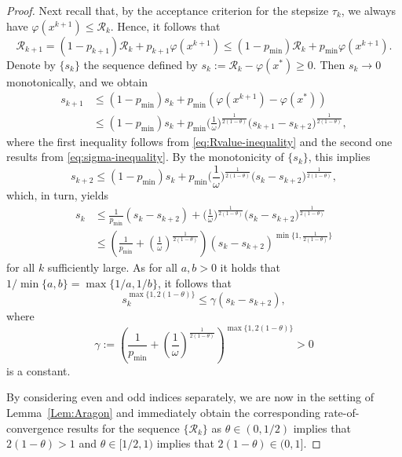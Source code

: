 \documentclass[10pt,a4paper]{amsart}
\newcommand{\Rvalue}{\mathcal{R}}
\newcommand{\pmin}{p_{\min}}
\newcommand{\tauk}{\tau_k}
\newcommand{\xkp}{x^{k+1}}
\begin{document}
\begin{proof}
Next recall that, by the acceptance criterion for the stepsize
$ \tauk $, we always have $ \varphi(\xkp) \leq \Rvalue_k $.
Hence, it follows that
\begin{equation}\label{eq:Rvalue-inequality}
	\Rvalue_{k+1} = (1-p_{k+1}) \Rvalue_k + p_{k+1} \varphi(\xkp) \leq (1-\pmin) \Rvalue_k + \pmin \varphi(\xkp).
\end{equation}
Denote by $\{s_k\}$ the sequence defined by $s_k := \Rvalue_k - \varphi(x^*)
\geq 0 $. Then $ s_k \to 0 $ monotonically, and we obtain
\begin{align*}
	s_{k+1} &\leq (1-\pmin) s_k + \pmin(\varphi(\xkp) - \varphi(x^*))\\
			&\leq (1-\pmin)s_k + \pmin \Big(\frac{1}{\omega}\Big)^{\frac{1}{2(1-\theta)}} \big( s_{k+1} - s_{k+2} \big)^{\frac{1}{2(1-\theta)}} ,
\end{align*}
where the first inequality follows from \eqref{eq:Rvalue-inequality}
and the second one results from \eqref{eq:sigma-inequality}.
	By the monotonicity of $\{s_k\}$, this implies
\begin{equation*}
	s_{k+2} \leq (1- \pmin) s_k + \pmin \Big(\frac{1}{\omega}\Big)^{\frac{1}{2(1-\theta)}} \big( s_{k} - s_{k+2} \big)^{\frac{1}{2(1-\theta)}},
\end{equation*}
which, in turn, yields
\begin{align*}
s_k &\leq \frac{1}{\pmin} (s_k -s_{k+2}) + \Big(\frac{1}{\omega}\Big)^{\frac{1}{2(1-\theta)}} \big( s_k - s_{k+2} \big)^{\frac{1}{2(1-\theta)}}\\
	&\leq \left(\frac{1}{\pmin} + \left(\frac{1}{\omega}\right)^{\frac{1}{2(1-\theta)}}\right) (s_k - s_{k+2})^{\min\{1, \frac{1}{2(1-\theta)}\}}
\end{align*}
for all $ k $ sufficiently large.
As for all $a, b > 0$ it holds that $1/\min\{a, b\} = \max\{1/a, 1/b\}$, it follows that
\begin{equation*}
s_k^{\max\{1, 2(1-\theta)\}} \leq \gamma (s_k - s_{k+2}),
\end{equation*}
where 
\begin{equation*}
\gamma := \left(\frac{1}{\pmin} + \left(\frac{1}{\omega}\right)^{\frac{1}{2(1-\theta)}}\right)^{\max\{1, 2(1-\theta)\}} > 0
\end{equation*}
is a constant.

By considering even and odd indices separately, we are now in the setting of Lemma~\ref{Lem:Aragon} and immediately obtain the 
corresponding rate-of-convergence results for the sequence $\{\Rvalue_k\}$ as $\theta \in (0, 1/2)$ implies that $2(1-\theta) > 1$ and $\theta \in [1/2, 1)$ implies that $2(1-\theta) \in (0, 1]$.


\end{proof}
\end{document}
